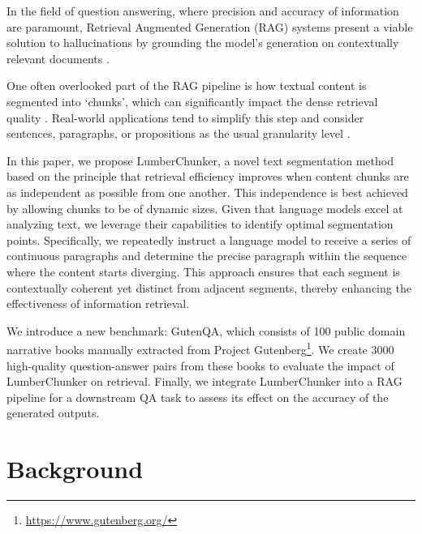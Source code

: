 \par


In the field of question answering, where precision and accuracy of information are paramount, Retrieval Augmented Generation (RAG) systems present a viable solution to hallucinations by grounding the model's generation on contextually relevant documents \cite{NLP_Rag_paper}.


\par
One often overlooked part of the RAG pipeline is how textual content is segmented into `chunks', which can significantly impact the dense retrieval quality \cite{llms_distracted_by_irrelevant_content}. Real-world applications tend to simplify this step and consider sentences, paragraphs, or propositions as the usual granularity level \cite{passage_strategies_old,proposition_paper}.
\par
In this paper, we propose LumberChunker, a novel text segmentation method based on the principle that retrieval efficiency improves when content chunks are as independent as possible from one another. This independence is best achieved by allowing chunks to be of dynamic sizes. Given that language models excel at analyzing text, we leverage their capabilities to identify optimal segmentation points. Specifically, we repeatedly instruct a language model to receive a series of continuous paragraphs and determine the precise paragraph within the sequence where the content starts diverging. This approach ensures that each segment is contextually coherent yet distinct from adjacent segments, thereby enhancing the effectiveness of information retrieval.
\par
We introduce a new benchmark: GutenQA, which consists of 100 public domain narrative books manually extracted from Project Gutenberg\footnote{\url{https://www.gutenberg.org/}}. We create 3000 high-quality question-answer pairs from these books to evaluate the impact of LumberChunker on retrieval. Finally, we integrate LumberChunker into a RAG pipeline for a downstream QA task to assess its effect on the accuracy of the generated outputs.



\section{Background}


